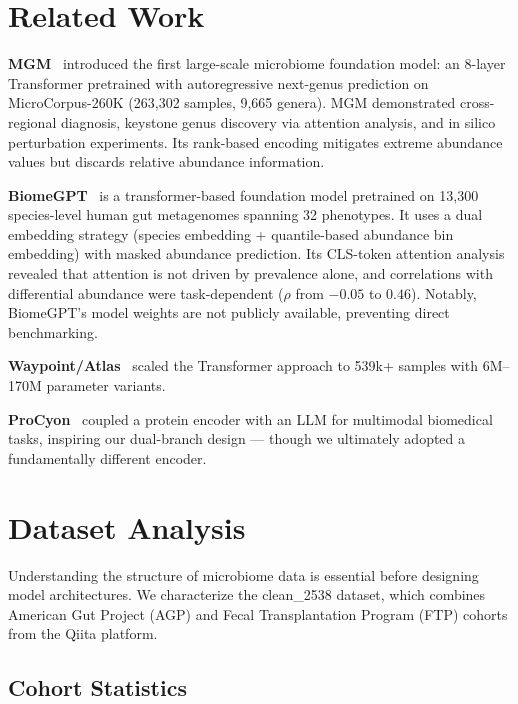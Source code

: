 \documentclass{article} %
\begin{document}
\section{Related Work}

\textbf{MGM}~\citep{mgm2024} introduced the first large-scale microbiome foundation model: an 8-layer Transformer pretrained with autoregressive next-genus prediction on MicroCorpus-260K (263,302 samples, 9,665 genera). MGM demonstrated cross-regional diagnosis, keystone genus discovery via attention analysis, and in silico perturbation experiments. Its rank-based encoding mitigates extreme abundance values but discards relative abundance information.

\textbf{BiomeGPT}~\citep{biomegpt2026} is a transformer-based foundation model pretrained on 13,300 species-level human gut metagenomes spanning 32 phenotypes. It uses a dual embedding strategy (species embedding + quantile-based abundance bin embedding) with masked abundance prediction. Its CLS-token attention analysis revealed that attention is not driven by prevalence alone, and correlations with differential abundance were task-dependent ($\rho$ from $-0.05$ to $0.46$). Notably, BiomeGPT's model weights are not publicly available, preventing direct benchmarking.

\textbf{Waypoint/Atlas}~\citep{waypoint2026} scaled the Transformer approach to 539k+ samples with 6M--170M parameter variants.

\textbf{ProCyon}~\citep{procyon2025} coupled a protein encoder with an LLM for multimodal biomedical tasks, inspiring our dual-branch design --- though we ultimately adopted a fundamentally different encoder.



\section{Dataset Analysis}

Understanding the structure of microbiome data is essential before designing model architectures. We characterize the clean\_2538 dataset, which combines American Gut Project (AGP) and Fecal Transplantation Program (FTP) cohorts from the Qiita platform.

\subsection{Cohort Statistics}
\end{document}
